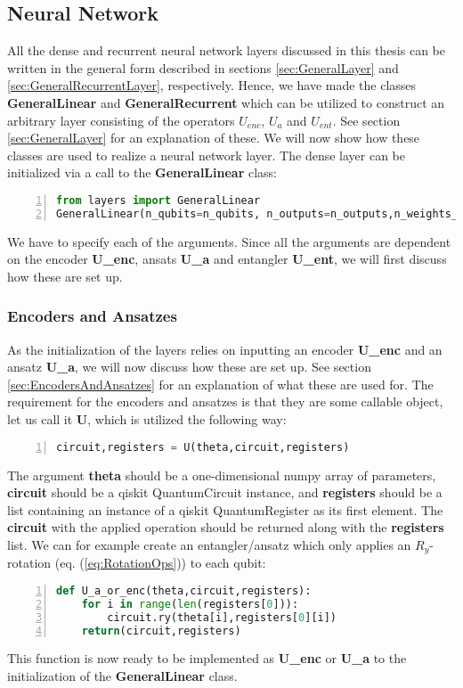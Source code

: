 \subsection{Neural Network}
\label{subsec:MethodsLayers}
All the dense and recurrent neural network layers discussed in this thesis can be written in the general form described in sections \ref{sec:GeneralLayer} and \ref{sec:GeneralRecurrentLayer}, respectively. Hence, we have made the classes \textbf{GeneralLinear} and \textbf{GeneralRecurrent} which can be utilized to construct an arbitrary layer consisting of the operators $U_{enc}$, $U_a$ and $U_{ent}$. See section \ref{sec:GeneralLayer} for an explanation of these. We will now show how these classes are used to realize a neural network layer. The dense layer can be initialized via a call to the \textbf{GeneralLinear} class:
\begin{lstlisting}[language=Python,numbers=left]
from layers import GeneralLinear
GeneralLinear(n_qubits=n_qubits, n_outputs=n_outputs,n_weights_ent=n_weights_ent,n_weights_a=n_weights_a,bias=bias,U_enc=U_enc,U_a=U_a,U_ent=U_ent,n_parallel=n_parallel)
\end{lstlisting}
We have to specify each of the arguments. Since all the arguments are dependent on the encoder \textbf{U\_enc}, ansats \textbf{U\_a} and entangler \textbf{U\_ent}, we will first discuss how these are set up.

\subsubsection{Encoders and Ansatzes}

As the initialization of the layers relies on inputting an encoder \textbf{U\_enc} and an ansatz \textbf{U\_a}, we will now discuss how these are set up. See section \ref{sec:EncodersAndAnsatzes} for an explanation of what these are used for. The requirement for the encoders and ansatzes is that they are some callable object, let us call it \textbf{U}, which is utilized the following way:
\begin{lstlisting}[language=Python,numbers=left]
circuit,registers = U(theta,circuit,registers)
\end{lstlisting}
The argument \textbf{theta} should be a one-dimensional numpy array of parameters, \textbf{circuit} should be a qiskit QuantumCircuit instance, and \textbf{registers} should be a list containing an instance of a qiskit QuantumRegister as its first element. The \textbf{circuit} with the applied operation should be returned along with the \textbf{registers} list. We can for example create an entangler/ansatz which only applies an $R_y$-rotation (eq. (\ref{eq:RotationOps})) to each qubit:
\begin{lstlisting}[language=Python,numbers=left]
def U_a_or_enc(theta,circuit,registers):
    for i in range(len(registers[0])):
        circuit.ry(theta[i],registers[0][i])
    return(circuit,registers)
\end{lstlisting}
This function is now ready to be implemented as \textbf{U\_enc} or \textbf{U\_a} to the initialization of the \textbf{GeneralLinear} class.

